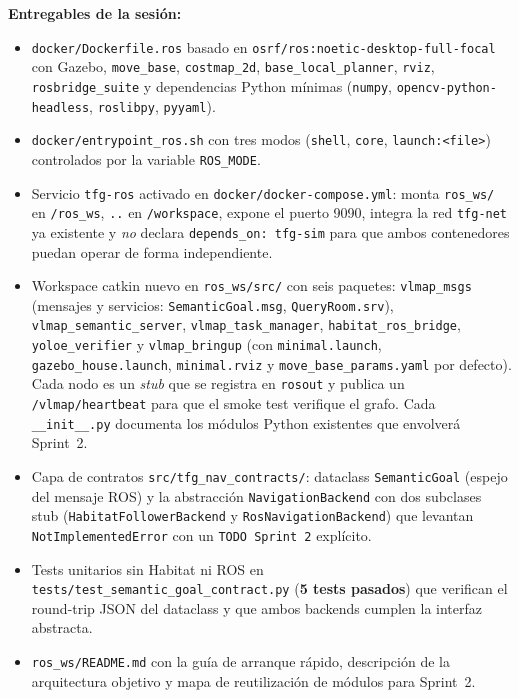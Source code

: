\documentclass[11pt,a4paper]{article}
\begin{document}
\textbf{Entregables de la sesión:}
\begin{itemize}
  \item \texttt{docker/Dockerfile.ros} basado en
        \texttt{osrf/ros:noetic-desktop-full-focal} con Gazebo,
        \texttt{move\_base}, \texttt{costmap\_2d},
        \texttt{base\_local\_planner}, \texttt{rviz},
        \texttt{rosbridge\_suite} y dependencias Python mínimas
        (\texttt{numpy}, \texttt{opencv-python-headless},
        \texttt{roslibpy}, \texttt{pyyaml}).
  \item \texttt{docker/entrypoint\_ros.sh} con tres modos
        (\texttt{shell}, \texttt{core}, \texttt{launch:<file>})
        controlados por la variable \texttt{ROS\_MODE}.
  \item Servicio \texttt{tfg-ros} activado en
        \texttt{docker/docker-compose.yml}: monta
        \texttt{ros\_ws/} en \texttt{/ros\_ws}, \texttt{..} en
        \texttt{/workspace}, expone el puerto 9090, integra la red
        \texttt{tfg-net} ya existente y \emph{no} declara
        \texttt{depends\_on: tfg-sim} para que ambos contenedores
        puedan operar de forma independiente.
  \item Workspace catkin nuevo en \texttt{ros\_ws/src/} con seis
        paquetes: \texttt{vlmap\_msgs} (mensajes y servicios:
        \texttt{SemanticGoal.msg}, \texttt{QueryRoom.srv}),
        \texttt{vlmap\_semantic\_server},
        \texttt{vlmap\_task\_manager},
        \texttt{habitat\_ros\_bridge},
        \texttt{yoloe\_verifier} y
        \texttt{vlmap\_bringup} (con \texttt{minimal.launch},
        \texttt{gazebo\_house.launch}, \texttt{minimal.rviz} y
        \texttt{move\_base\_params.yaml} por defecto).
        Cada nodo es un \emph{stub} que se registra en \texttt{rosout}
        y publica un \texttt{/vlmap/heartbeat} para que el smoke test
        verifique el grafo. Cada \texttt{\_\_init\_\_.py} documenta los
        módulos Python existentes que envolverá Sprint~2.
  \item Capa de contratos \texttt{src/tfg\_nav\_contracts/}: dataclass
        \texttt{SemanticGoal} (espejo del mensaje ROS) y la
        abstracción \texttt{NavigationBackend} con dos subclases stub
        (\texttt{HabitatFollowerBackend} y
        \texttt{RosNavigationBackend}) que levantan
        \texttt{NotImplementedError} con un \texttt{TODO Sprint~2}
        explícito.
  \item Tests unitarios sin Habitat ni ROS en
        \texttt{tests/test\_semantic\_goal\_contract.py}
        (\textbf{5 tests pasados}) que verifican el round-trip
        JSON del dataclass y que ambos backends cumplen la interfaz
        abstracta.
  \item \texttt{ros\_ws/README.md} con la guía de arranque rápido,
        descripción de la arquitectura objetivo y mapa de
        reutilización de módulos para Sprint~2.
\end{itemize}
\end{document}
